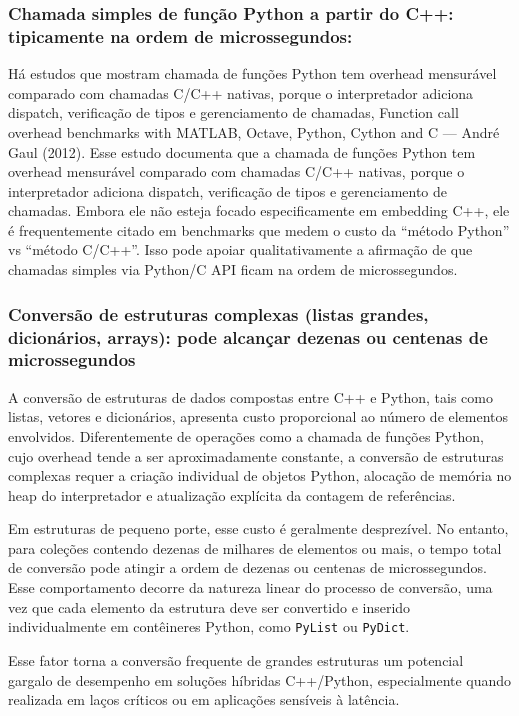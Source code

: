     \subsubsection{ Chamada simples de função Python a partir do C++: tipicamente na ordem de microssegundos:}
    Há estudos que mostram chamada de funções Python tem overhead mensurável comparado com chamadas C/C++ nativas, porque o interpretador adiciona dispatch, verificação de tipos e gerenciamento de chamadas, Function call overhead benchmarks with MATLAB, Octave, Python, Cython and C — André Gaul (2012). Esse estudo documenta que a chamada de funções Python tem overhead mensurável comparado com chamadas C/C++ nativas, porque o interpretador adiciona dispatch, verificação de tipos e gerenciamento de chamadas. Embora ele não esteja focado especificamente em embedding C++, ele é frequentemente citado em benchmarks que medem o custo da “método Python” vs “método C/C++”. Isso pode apoiar qualitativamente a afirmação de que chamadas simples via Python/C API ficam na ordem de microssegundos.

    \subsubsection{ Conversão de estruturas complexas (listas grandes, dicionários, arrays): pode alcançar dezenas ou centenas de microssegundos}

A conversão de estruturas de dados compostas entre C++ e Python, tais como listas, vetores e dicionários, apresenta custo proporcional ao número de elementos envolvidos. Diferentemente de operações como a chamada de funções Python, cujo overhead tende a ser aproximadamente constante, a conversão de estruturas complexas requer a criação individual de objetos Python, alocação de memória no heap do interpretador e atualização explícita da contagem de referências.

Em estruturas de pequeno porte, esse custo é geralmente desprezível. No entanto, para coleções contendo dezenas de milhares de elementos ou mais, o tempo total de conversão pode atingir a ordem de dezenas ou centenas de microssegundos. Esse comportamento decorre da natureza linear do processo de conversão, uma vez que cada elemento da estrutura deve ser convertido e inserido individualmente em contêineres Python, como \texttt{PyList} ou \texttt{PyDict}.

Esse fator torna a conversão frequente de grandes estruturas um potencial gargalo de desempenho em soluções híbridas C++/Python, especialmente quando realizada em laços críticos ou em aplicações sensíveis à latência.

